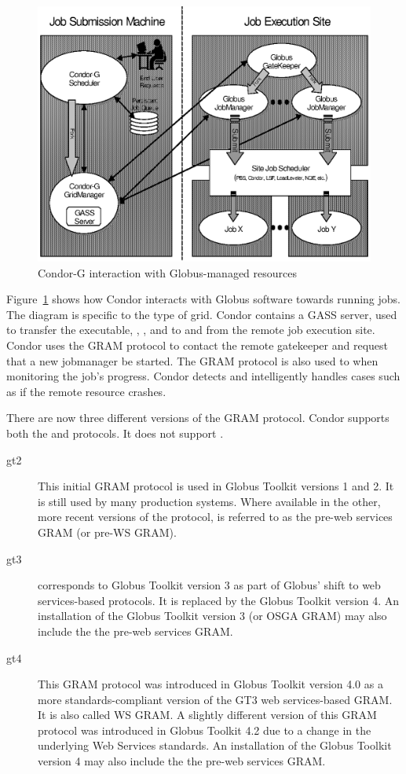 \begin{figure}[hbt]
\centering
\includegraphics{grids/gfig1.eps}
\caption{\label{fig:condorg}Condor-G interaction with Globus-managed resources}
\end{figure}

Figure~\ref{fig:condorg} shows how Condor interacts with Globus software
towards running jobs.
The diagram is specific to the  type of grid.
Condor contains a GASS server, used to transfer the executable,
, , and  to and from
the remote job execution site.
Condor uses the GRAM protocol to contact the remote gatekeeper
and request that a new jobmanager be started.
The GRAM protocol is also used to when monitoring the job's progress.
Condor detects and intelligently handles cases
such as if the remote resource crashes.

There are now three different versions of the GRAM protocol.
Condor supports both the  and 
protocols.  It does not support .
\begin{description}
\item[gt2]
This initial GRAM protocol is used in Globus Toolkit versions 1 and 2.
It is still used by many production systems.
Where available in the other, more recent versions of the protocol,
 is referred to as the pre-web services GRAM 
(or pre-WS GRAM).
\item[gt3]
 corresponds to
Globus Toolkit version 3 as part of
Globus' shift to web services-based protocols.
It is replaced by  the Globus Toolkit version 4.
An installation of the Globus Toolkit version 3 
(or OSGA GRAM) may also
include the the pre-web services GRAM.
\item[gt4]
This GRAM protocol was introduced in Globus Toolkit version 4.0 as a more
standards-compliant version of the GT3 web services-based GRAM.
It is also called WS GRAM. A slightly different version of this GRAM
protocol was introduced in Globus Toolkit 4.2 due to a change in the
underlying Web Services standards.
An installation of the Globus Toolkit version 4 may also
include the the pre-web services GRAM.
\end{description}

